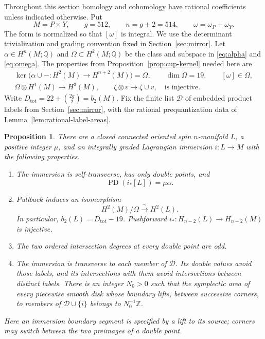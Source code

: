\documentclass[11pt]{article}
\numberwithin{equation}{section}
\newtheorem{proposition}[theorem]{Proposition}
\theoremstyle{definition}
\theoremstyle{remark}
\begin{document}
Throughout this section homology and cohomology have rational coefficients
unless indicated otherwise.  Put
\[
 M=P\times Y,\qquad g=512,\qquad n=g+2=514,
 \qquad \omega=\omega_P+\omega_Y.
\]
The form is normalized so that $[\omega]$ is integral.  We use the
determinant trivialization and grading convention fixed in
Section~\ref{sec:mirror}.  Let $\alpha\in H^n(M;\mathbb Q)$ and
$\Omega\subset H^2(M;\mathbb Q)$ be the class and subspace in
\eqref{eq:alpha} and \eqref{eq:omega}.  The properties from
Proposition~\ref{prop:cup-kernel} needed here are
\begin{equation}\label{top:eq:inputs}
 \begin{gathered}
 \ker\bigl(\alpha\cup-:H^2(M)\longrightarrow H^{n+2}(M)\bigr)=\Omega,
 \qquad \dim\Omega=19,\qquad [\omega]\in\Omega,\\
 \Omega\otimes H^1(M)\longrightarrow H^3(M),
 \qquad \zeta\otimes v\longmapsto\zeta\cup v,
 \quad\text{is injective}.
 \end{gathered}
\end{equation}
Write $D_{\mathrm{tot}}=22+\binom{2g}{2}=b_2(M)$.  Fix the finite
list $\mathcal D$ of embedded product labels from
Section~\ref{sec:mirror}, with the rational prequantization data of
Lemma~\ref{lem:rational-label-areas}.

\begin{proposition}\label{prop:immersion}
There are a closed connected oriented spin $n$-manifold $L$, a positive
integer $\mu$, and an integrally graded Lagrangian immersion $i:L\to M$
with the following properties.
\begin{enumerate}[label=\textup{(\roman*)}]
 \item The immersion is self-transverse, has only double points, and
 \[
       \operatorname{PD}(i_*[L])=\mu\alpha.
 \]
 \item Pullback induces an isomorphism
 \[
       H^2(M)/\Omega\xrightarrow{\ \sim\ }H^2(L).
 \]
 In particular, $b_2(L)=D_{\mathrm{tot}}-19$.  Pushforward
 $i_*:H_{n-2}(L)\to H_{n-2}(M)$ is injective.
 \item The two ordered intersection degrees at every double point are
 odd.
 \item The immersion is transverse to each member of $\mathcal D$.
 Its double values avoid those labels, and its intersections with them
 avoid intersections between distinct labels.  There is an integer
 $N_0>0$ such that the symplectic area of every piecewise smooth disk
 whose boundary lifts, between successive corners, to members of
 $\mathcal D\cup\{i\}$ belongs to $N_0^{-1}\mathbb Z$.
\end{enumerate}
Here an immersion boundary segment is specified by a lift to its source;
corners may switch between the two preimages of a double point.
\end{proposition}
\end{document}
